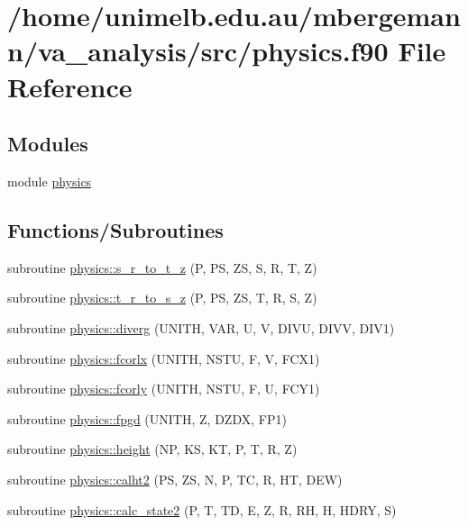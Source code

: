 \hypertarget{physics_8f90}{}\section{/home/unimelb.edu.\+au/mbergemann/va\+\_\+analysis/src/physics.f90 File Reference}
\label{physics_8f90}
\subsection*{Modules}
\begin{DoxyCompactItemize}
\item 
module \hyperlink{namespacephysics}{physics}
\end{DoxyCompactItemize}
\subsection*{Functions/\+Subroutines}
\begin{DoxyCompactItemize}
\item 
subroutine \hyperlink{namespacephysics_a3f1959e7b3ff1a8d052f1e0441b1c379}{physics\+::s\+\_\+r\+\_\+to\+\_\+t\+\_\+z} (P, PS, ZS, S, R, T, Z)
\item 
subroutine \hyperlink{namespacephysics_aebc42cd426e3ef8e85696bb1c7da18c3}{physics\+::t\+\_\+r\+\_\+to\+\_\+s\+\_\+z} (P, PS, ZS, T, R, S, Z)
\item 
subroutine \hyperlink{namespacephysics_adc35216d512f6586071a79fba286a39c}{physics\+::diverg} (U\+N\+I\+TH, V\+AR, U, V, D\+I\+VU, D\+I\+VV, D\+I\+V1)
\item 
subroutine \hyperlink{namespacephysics_a56a179b5bd2c13a2201b2367037a42cf}{physics\+::fcorlx} (U\+N\+I\+TH, N\+S\+TU, F, V, F\+C\+X1)
\item 
subroutine \hyperlink{namespacephysics_a1f64bd544ea55c7fbbf5330725fc0896}{physics\+::fcorly} (U\+N\+I\+TH, N\+S\+TU, F, U, F\+C\+Y1)
\item 
subroutine \hyperlink{namespacephysics_acf841366af6f4fd7502b4031a2cacb56}{physics\+::fpgd} (U\+N\+I\+TH, Z, D\+Z\+DX, F\+P1)
\item 
subroutine \hyperlink{namespacephysics_a0ca41ce81224f2d7b292dc474c080c60}{physics\+::height} (NP, KS, KT, P, T, R, Z)
\item 
subroutine \hyperlink{namespacephysics_a16ab28545ccd5528dd72f50208761dbe}{physics\+::calht2} (PS, ZS, N, P, TC, R, HT, D\+EW)
\item 
subroutine \hyperlink{namespacephysics_a9197b79c7b8e6dfce5ecca360c320610}{physics\+::calc\+\_\+state2} (P, T, TD, E, Z, R, RH, H, H\+D\+RY, S)
\end{DoxyCompactItemize}
